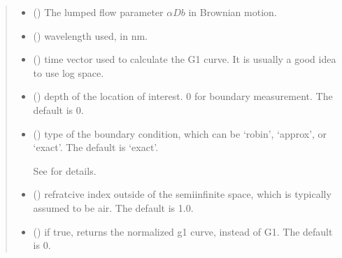 \documentclass[letterpaper,10pt,english]{sphinxmanual}
\begin{document}
\begin{fulllineitems}
\begin{quote}
\begin{description}
\begin{itemize}
\item {} 
\sphinxAtStartPar
{} () \textendash{} The lumped flow parameter \(\alpha Db\) in Brownian motion.

\item {} 
\sphinxAtStartPar
{} () \textendash{} wavelength used, in nm.

\item {} 
\sphinxAtStartPar
{} () \textendash{} time vector used to calculate the G1 curve. It is usually a good idea to use log space.

\item {} 
\sphinxAtStartPar
{} (\sphinxstyleliteralemphasis{\sphinxupquote{, }}) \textendash{} depth of the location of interest. 0 for boundary measurement. The default is 0.

\item {} 
\sphinxAtStartPar
{} (\sphinxstyleliteralemphasis{\sphinxupquote{, }}) \textendash{} 
\sphinxAtStartPar
type of the boundary condition, which can be ‘robin’, ‘approx’, or ‘exact’. The default is ‘exact’.

\sphinxAtStartPar
See {\hyperref[\detokenize{_autosummary/nirfasterff.utils.boundary_attenuation:nirfasterff.utils.boundary_attenuation}]{}} for details.


\item {} 
\sphinxAtStartPar
{} (\sphinxstyleliteralemphasis{\sphinxupquote{, }}) \textendash{} refratcive index outside of the semi\sphinxhyphen{}infinite space, which is typically assumed to be air. The default is 1.0.

\item {} 
\sphinxAtStartPar
{} (\sphinxstyleliteralemphasis{\sphinxupquote{, }}) \textendash{} if true, returns the normalized g1 curve, instead of G1. The default is 0.


\end{itemize}
\end{description}
\end{quote}
\end{fulllineitems}
\end{document}
